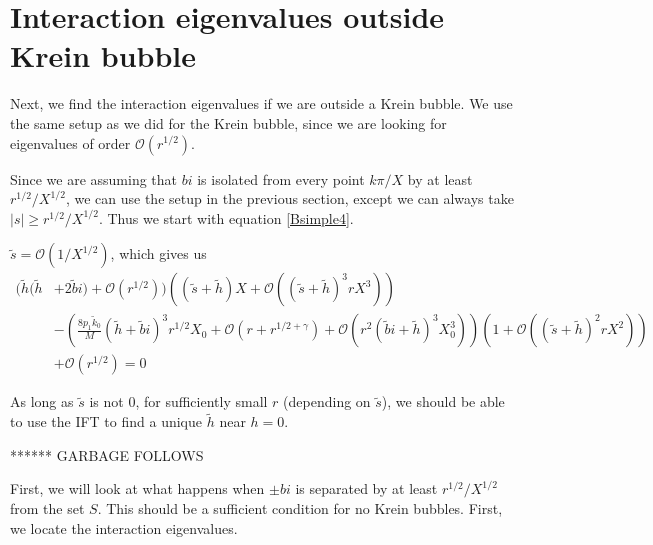 \documentclass[thesis.tex]{subfiles}
\begin{document}
\section{Interaction eigenvalues outside Krein bubble}

Next, we find the interaction eigenvalues if we are outside a Krein bubble. We use the same setup as we did for the Krein bubble, since we are looking for eigenvalues of order $\mathcal{O}(r^{1/2})$. 

Since we are assuming that $bi$ is isolated from every point $k \pi / X$ by at least $r^{1/2}/X^{1/2}$, we can use the setup in the previous section, except we can always take $|s| \geq r^{1/2}/X^{1/2}$. Thus we start with equation \cref{Bsimple4}. 

 $\tilde{s} = \mathcal{O}(1/X^{1/2})$, which gives us
\begin{equation}\label{Binteig1}
\begin{aligned}
( \tilde{h}( \tilde{h} &+ 2 \tilde{b} i) + \mathcal{O}( r^{1/2} ))\left( (\tilde{s} + \tilde{h})X + \mathcal{O}\left( (\tilde{s} + \tilde{h})^3 r X^3 \right) \right) \\ 
&- \left(\frac{8 p_1 \tilde{k}_0}{M} ( \tilde{h} + \tilde{b}i)^3 r^{1/2} X_0 + \mathcal{O}(r + r^{1/2 + \gamma}) + \mathcal{O}(r^{2} (\tilde{b}i + \tilde{h})^3 X_0^3) \right)\left( 1 + \mathcal{O}\left( (\tilde{s} + \tilde{h})^2 r X^2 \right) \right) \\
&+ \mathcal{O}( r^{1/2} ) = 0
\end{aligned}
\end{equation} 

As long as $\tilde{s}$ is not 0, for sufficiently small $r$ (depending on $\tilde{s}$), we should be able to use the IFT to find a unique $\tilde{h}$ near $h = 0$. 



******
GARBAGE FOLLOWS

First, we will look at what happens when $\pm bi$ is separated by at least $r^{1/2}/X^{1/2}$ from the set $S$. This should be a sufficient condition for no Krein bubbles. First, we locate the interaction eigenvalues.
\end{document}
